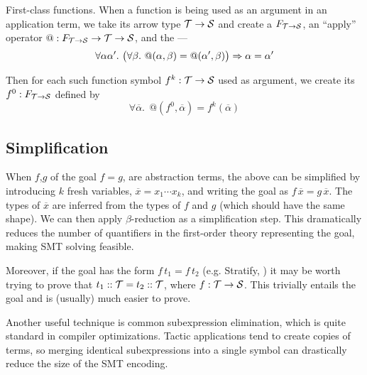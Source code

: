 \begin{paragraph}{First-class functions.}
When a function is being used as an argument in an application term, 
we take its arrow type $\mathcal{T}\to\mathcal{S}$ and create a  $F_{\mathcal{T}\to\mathcal{S}}$,
an ``apply'' operator $@ : F_{\mathcal{T}\to\mathcal{S}}\to\mathcal{T}\to\mathcal{S}$, and the  ---
\begin{equation}
\forall \alpha\alpha'.~ \big(\forall\beta.~ @(\alpha,\beta)=@(\alpha',\beta)\big)\Rightarrow \alpha=\alpha'
\label{automated:extensionality}
\end{equation}

Then for each such function symbol $f^k:\mathcal{T}\to\mathcal{S}$ used as argument, we create its 
 $f^0:F_{\mathcal{T}\to\mathcal{S}}$ defined by
\begin{equation}
\forall \overline\alpha.~~@(f^0,\overline\alpha)=f^k(\overline\alpha)
\label{automated:reflection}
\end{equation}
\end{paragraph}

\subsection{Simplification}
\label{automated:simplification}

When $f$,$g$ of the goal $f=g$, are abstraction terms, the above can be simplified by
introducing $k$ fresh variables, $\overline x=x_1\cdots x_k$, and writing the goal as
$f\,\overline x = g\,\overline x$. The types of $\overline x$ are inferred from the types
of $f$ and $g$ (which should have the same shape). We can then apply $\beta$-reduction as
a simplification step. This dramatically reduces the number of quantifiers in the first-order
theory representing the goal, making SMT solving feasible.

Moreover, if the goal has the form $f\,t_1 = f\,t_2$ (e.g. {\sf Stratify}, ) it may
be worth trying to prove that $t_1::\mathcal{T} = t_2::\mathcal{T}$, where $f:\mathcal{T}\to\mathcal{S}$.
This trivially entails the goal and is (usually) much easier to prove. 

Another useful technique is common subexpression elimination, which is quite standard
in compiler optimizations. Tactic applications tend to create copies of terms, so
merging identical subexpressions into a single symbol can drastically reduce the size
of the SMT encoding.

